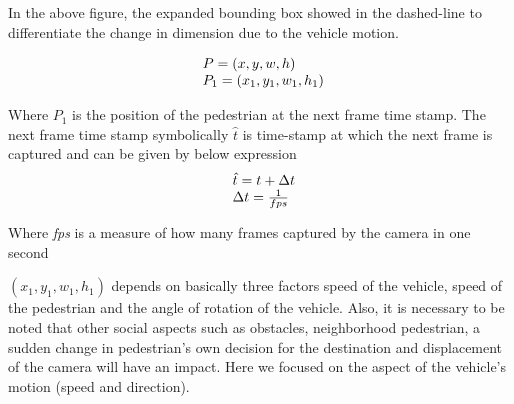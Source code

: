 In the above figure, the expanded bounding box showed in the dashed-line to differentiate the change in dimension due to the vehicle motion.

\begin{equation}
\begin{array}{l@{}}
{P}=(x,y,w,h) \\
{P}_1=(x_1,y_1,w_1,h_1)
\end{array}
\end{equation}

Where ${P}_1$ is the position of the pedestrian at the next frame time stamp.
The next frame time stamp symbolically $\hat{t}$ is time-stamp at which the next frame is captured and can be given by below expression
\begin{equation} \label{delta-t}
\begin{array}{l@{}}
\hat{t} = t +  \Delta t \\
\Delta t = \frac{1}{fps}
\end{array}
\end{equation}


Where \textit{fps} is a measure of how many frames captured by the camera in one second

$(x_1,y_1,w_1,h_1)$ depends on basically three factors speed of the vehicle, speed of the pedestrian and the angle of rotation of the vehicle. Also, it is necessary to be noted that other social aspects such as obstacles, neighborhood pedestrian, a sudden change in pedestrian's own decision for the destination and displacement of the camera will have an impact.
Here we focused on the aspect of the vehicle's motion (speed and direction).






